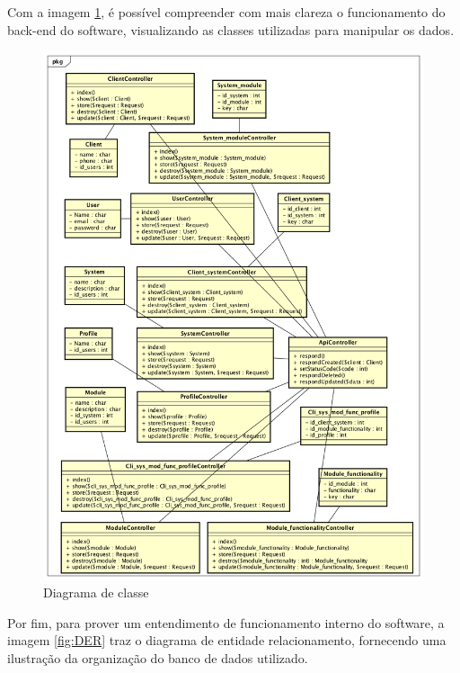 Com a imagem \ref{fig:Diagrama de classe}, é possível compreender com mais clareza o funcionamento do back-end do software, visualizando as classes utilizadas para manipular os dados.

\begin{figure}
	\label{fig:Diagrama de classe}
	\includegraphics[width=1\textwidth]{img/Diagrama_de_classe}
	\caption{Diagrama de classe}
\end{figure}


Por fim, para prover um entendimento de funcionamento interno do software, a imagem \ref{fig:DER} traz o diagrama de entidade relacionamento, fornecendo uma ilustração da organização do banco de dados utilizado.


